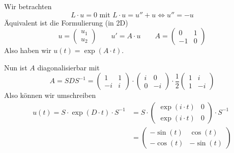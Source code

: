 \documentclass[main.tex]{subfiles}
\begin{document}
\begin{Beispiel}
  Wir betrachten
  $$L \cdot u = 0 \text{ mit } L \cdot u = u'' + u \Leftrightarrow u'' = -u$$
  Äquivalent ist die Formulierung (in 2D)
  $$u = \begin{pmatrix}
    u_1 \\ u_2
  \end{pmatrix} \qquad u' = A \cdot u \qquad A = \begin{pmatrix}
    0 & 1 \\ -1 & 0
  \end{pmatrix}$$
  Also haben wir $u(t) = \exp(A \cdot t)$.

  Nun ist $A$ diagonalisierbar mit
  $$A = S D S^{-1} = \begin{pmatrix}
    1 & 1 \\ -i & i
  \end{pmatrix} \cdot \begin{pmatrix}
    i & 0 \\ 0 & -i
  \end{pmatrix} \cdot \dfrac{1}{2}\begin{pmatrix}
    1 & i \\ 1 & -i
  \end{pmatrix}$$
  Also können wir umschreiben
  $$\begin{aligned}
    u(t) = S \cdot \exp(D \cdot t) \cdot S^{-1} & = S \cdot \begin{pmatrix}
      \exp(i \cdot t) & 0 \\ \exp(i \cdot t) & 0
    \end{pmatrix} \cdot S^{-1} \\
    & = \begin{pmatrix}
      -\sin(t) & \cos(t) \\ - \cos(t) & -\sin(t)
    \end{pmatrix}
  \end{aligned}$$
\end{Beispiel}
\end{document}
